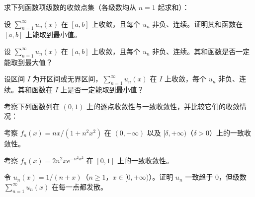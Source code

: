 \noindent\begin{minipage}{\textwidth}
求下列函数项级数的收敛点集（各级数均从 $n=1$ 起求和）：
\end{minipage}\par\vfill
\noindent\begin{minipage}{\textwidth}
设 $\sum_{n=1}^{\infty}u_n(x)$ 在 $[a,b]$ 上收敛，且每个 $u_n$ 非负、连续。证明其和函数在 $[a,b]$ 上能取到最小值。
\end{minipage}\par\vfill
\newpage
\noindent\begin{minipage}{\textwidth}
设 $\sum_{n=1}^{\infty}u_n(x)$ 在 $[a,b]$ 上收敛，且每个 $u_n$ 非负、连续。其和函数是否一定能取到最大值？
\end{minipage}\par\vfill
\noindent\begin{minipage}{\textwidth}
设区间 $I$ 为开区间或无界区间，$\sum_{n=1}^{\infty}u_n(x)$ 在 $I$ 上收敛，每个 $u_n$ 非负、连续。其和函数在 $I$ 上是否一定能取到最小值？
\end{minipage}\par\vfill
\noindent\begin{minipage}{\textwidth}
考察下列函数列在 $(0,1)$ 上的逐点收敛性与一致收敛性，并比较它们的收敛情况：
\end{minipage}\par\vfill
\newpage
\noindent\begin{minipage}{\textwidth}
考察 $f_n(x)=nx/(1+n^2x^2)$ 在 $(0,+\infty)$ 以及 $[\delta,+\infty)$（$\delta>0$）上的一致收敛性。
\end{minipage}\par\vfill
\noindent\begin{minipage}{\textwidth}
考察 $f_n(x)=2n^2xe^{-n^2x^2}$ 在 $[0,1]$ 上的一致收敛性。
\end{minipage}\par\vfill
\noindent\begin{minipage}{\textwidth}
令 $u_n(x)=1/(n+x)$（$n\ge1$，$x\in[0,+\infty)$）。证明 $u_n$ 一致趋于 $0$，但级数 $\sum_{n=1}^{\infty}u_n(x)$ 在每一点都发散。
\end{minipage}\par\vfill
